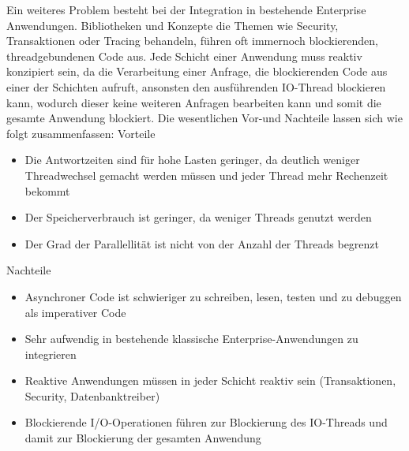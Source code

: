 Ein weiteres Problem besteht bei der Integration in bestehende Enterprise Anwendungen. Bibliotheken und Konzepte die Themen wie
Security, Transaktionen oder Tracing behandeln, führen oft immernoch blockierenden, threadgebundenen Code aus.
Jede Schicht einer Anwendung muss reaktiv konzipiert sein, da die Verarbeitung einer Anfrage, die blockierenden Code aus einer der
Schichten aufruft, ansonsten den ausführenden IO-Thread blockieren kann, wodurch dieser keine weiteren Anfragen bearbeiten kann und somit die gesamte Anwendung blockiert.
\newline\newline
Die wesentlichen Vor-und Nachteile lassen sich wie folgt zusammenfassen:
\newline
\newline
Vorteile
\begin{itemize}
  \item Die Antwortzeiten sind für hohe Lasten geringer, da deutlich weniger Threadwechsel gemacht werden müssen und jeder Thread
        mehr Rechenzeit bekommt
  \item Der Speicherverbrauch ist geringer, da weniger Threads genutzt werden
  \item Der Grad der Parallellität ist nicht von der Anzahl der Threads begrenzt
\end{itemize}
Nachteile
\begin{itemize}
  \item Asynchroner Code ist schwieriger zu schreiben, lesen, testen und zu debuggen als imperativer Code
  \item Sehr aufwendig in bestehende klassische Enterprise-Anwendungen zu integrieren
  \item Reaktive Anwendungen müssen in jeder Schicht reaktiv sein (Transaktionen, Security, Datenbanktreiber)
  \item Blockierende I/O-Operationen führen zur Blockierung des IO-Threads und damit zur Blockierung der gesamten Anwendung
\end{itemize}

